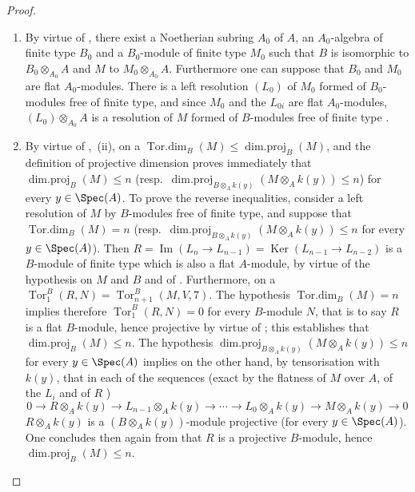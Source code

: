 \begin{proof}
\begin{enumerate}[label=(\roman*)]
  \item By virtue of , there exist a Noetherian subring $A_0$ of $A$, an $A_0$-algebra of finite type $B_0$ and a $B_0$-module of finite type $M_0$ such that $B$ is isomorphic to $B_0\otimes_{A_0}A$ and $M$ to $M_0\otimes_{A_0}A$.
Furthermore  one can suppose that $B_0$ and $M_0$ are flat $A_0$-modules.
There is a left resolution $(L_0)$ of $M_0$ formed of $B_0$-modules free of finite type, and since $M_0$ and the $L_{0i}$ are flat $A_0$-modules, $(L_0)\otimes_{A_0}A$ is a resolution of $M$ formed of $B$-modules free of finite type .

  \item By virtue of ,~(ii), on a $\operatorname{Tor.dim}_B(M)\leqslant\operatorname{dim.proj}_B(M)$, and the definition of projective dimension proves immediately that $\operatorname{dim.proj}_B(M)\leqslant n$ (resp.\ $\operatorname{dim.proj}_{B\otimes_A k(y)}(M\otimes_A k(y))\leqslant n$) for every $y\in\Spec(A)$.
To prove the reverse inequalities, consider a left resolution of $M$ by $B$-modules free of finite type, and suppose that $\operatorname{Tor.dim}_B(M)=n$ (resp.\ $\operatorname{dim.proj}_{B\otimes_A k(y)}(M\otimes_A k(y))\leqslant n$ for every $y\in\Spec(A)$).
Then $R=\operatorname{Im}(L_n\to L_{n-1})=\operatorname{Ker}(L_{n-1}\to L_{n-2})$ is a $B$-module of finite type which is also a flat $A$-module, by virtue of the hypothesis on $M$ and $B$ and of .
Furthermore, on a $\operatorname{Tor}_1^B(R,N)=\operatorname{Tor}_{n+1}^B(M,V,7)$.
The hypothesis $\operatorname{Tor.dim}_B(M)=n$ implies therefore $\operatorname{Tor}_1^B(R,N)=0$ for every $B$-module $N$, that is to say $R$ is a flat $B$-module, hence projective by virtue of ; this establishes that $\operatorname{dim.proj}_B(M)\leqslant n$.
The hypothesis $\operatorname{dim.proj}_{B\otimes_A k(y)}(M\otimes_A k(y))\leqslant n$ for every $y\in\Spec(A)$ implies on the other hand, by tensorisation with $k(y)$, that in each of the sequences (exact by the flatness of $M$ over $A$, of the $L_i$ and of $R$ )
\[
  0\to R\otimes_A k(y)\to L_{n-1}\otimes_A k(y)\to\cdots\to L_0\otimes_A k(y)\to M\otimes_A k(y)\to 0
\]
$R\otimes_A k(y)$ is a $(B\otimes_A k(y))$-module projective (for every $y\in\Spec(A)$).
One concludes then again from  that $R$ is a projective $B$-module, hence $\operatorname{dim.proj}_B(M)\leqslant n$.
\end{enumerate}
\end{proof}

